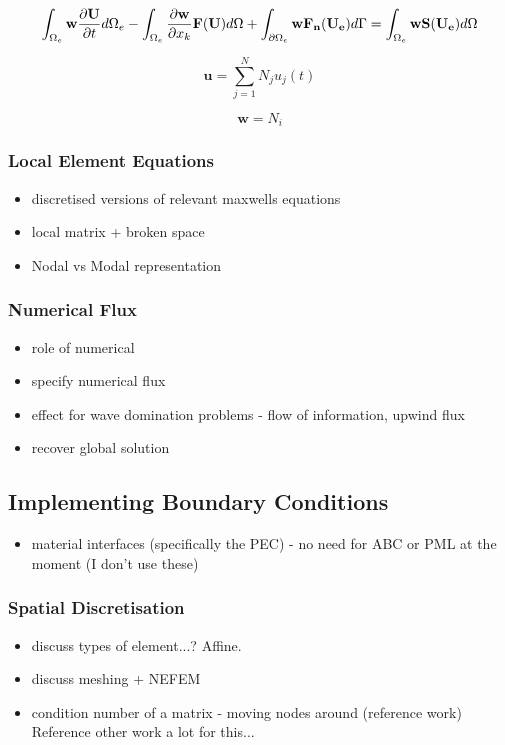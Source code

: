 $$
\int_{\Omega_e} \mathbf{w} \frac{\partial \mathbf{U}}{\partial t} d\Omega_e  - \int_{\Omega_e} \frac{\partial \mathbf{w}}{ \partial x_k} \mathbf{F}(\mathbf{U}) d\Omega + \int_{\partial \Omega_e} \mathbf{w} \mathbf{F_n}(\mathbf{U_e}) d\Gamma = \int_{\Omega_e} \mathbf{w} \mathbf{S}(\mathbf{U_e}) d\Omega
$$

$$
\mathbf{u} = \sum^{N}_{j=1} N_j u_j(t)
$$

$$
\mathbf{w} = N_i
$$

\subsubsection{Local Element Equations}
\begin{itemize}
  \item discretised versions of relevant maxwells equations
	\item local matrix + broken space
	\item Nodal vs Modal representation
\end{itemize}
\subsubsection{Numerical Flux}
\begin{itemize}
	\item role of numerical
  \item specify numerical flux %
	\item effect for wave domination problems - flow of information, upwind flux
	\item recover global solution
\end{itemize}
\subsection{Implementing Boundary Conditions}
\begin{itemize}
	\item material interfaces (specifically the PEC) - no need for ABC or PML at the moment (I don't use these)
\end{itemize}
\subsubsection{Spatial Discretisation}
\begin{itemize}
	\item discuss types of element...? Affine.
	\item discuss meshing + NEFEM
	\item condition number of a matrix - moving nodes around (reference work)
Reference other work a lot for this...
\end{itemize}
